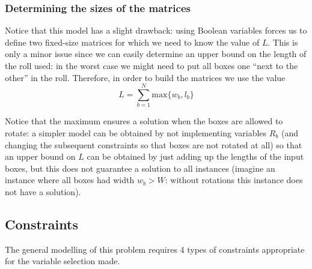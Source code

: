 \subsubsection{Determining the sizes of the matrices}
\label{sec:modelling:variables:value-L}

Notice that this model has a slight drawback: using Boolean variables forces us to define
two fixed-size matrices for which we need to know the value of $L$. This is only a minor
issue since we can easily determine an upper bound on the length of the roll used: in the
worst case we might need to put all boxes one ``next to the other'' in the roll. Therefore,
in order to build the matrices we use the value
\begin{equation}
\label{eq:upper-bound-L}
L = \sum_{b=1}^N \text{max}\{w_b, l_b\}
\end{equation}

Notice that the maximum ensures a solution when the boxes are allowed to rotate: a simpler
model can be obtained by not implementing variables $R_b$ (and changing the subsequent
constraints so that boxes are not rotated at all) so that an upper bound on $L$ can be
obtained by just adding up the lengths of the input boxes, but this does not guarantee
a solution to all instances (imagine an instance where all boxes had width $w_b > W$:
without rotations this instance does not have a solution).

\subsection{Constraints}
\label{sec:modelling:constraints}

The general modelling of this problem requires 4 types of constraints
appropriate for the variable selection made.

